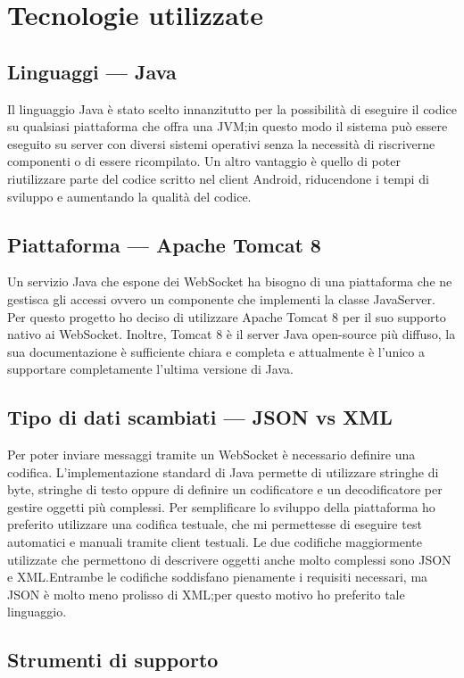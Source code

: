 \section{Tecnologie utilizzate}
	\subsection{Linguaggi --- Java}
	Il linguaggio Java è stato scelto innanzitutto per la possibilità di eseguire il codice su qualsiasi piattaforma che offra una \gls{JVM};\@ in questo modo il sistema può essere eseguito su server con diversi sistemi operativi senza la necessità di riscriverne componenti o di essere ricompilato. Un altro vantaggio è quello di poter riutilizzare parte del codice scritto nel client Android, riducendone i tempi di sviluppo e aumentando la qualità del codice.

	\subsection{Piattaforma --- Apache Tomcat 8}
	Un servizio Java che espone dei WebSocket ha bisogno di una piattaforma che ne gestisca gli accessi ovvero un componente che implementi la classe JavaServer. Per questo progetto ho deciso di utilizzare Apache Tomcat 8 per il suo supporto nativo ai WebSocket. Inoltre, Tomcat 8 è il server Java open-source più diffuso, la sua documentazione è sufficiente chiara e completa e attualmente è l'unico a supportare completamente l'ultima versione di Java.

	\subsection{Tipo di dati scambiati --- \gls{JSON} vs \gls{XML}}
	Per poter inviare messaggi tramite un WebSocket è necessario definire una codifica. L'implementazione standard di Java permette di utilizzare stringhe di byte, stringhe di testo oppure di definire un codificatore e un decodificatore per gestire oggetti più complessi. Per semplificare lo sviluppo della piattaforma ho preferito utilizzare una codifica testuale, che mi permettesse di eseguire test automatici e manuali tramite client testuali. Le due codifiche maggiormente utilizzate che permettono di descrivere oggetti anche molto complessi sono \gls{JSON} e \gls{XML}.\@ Entrambe le codifiche soddisfano pienamente i requisiti necessari, ma \gls{JSON} è molto meno prolisso di \gls{XML};\@ per questo motivo ho preferito tale linguaggio.

	\subsection{Strumenti di supporto}
